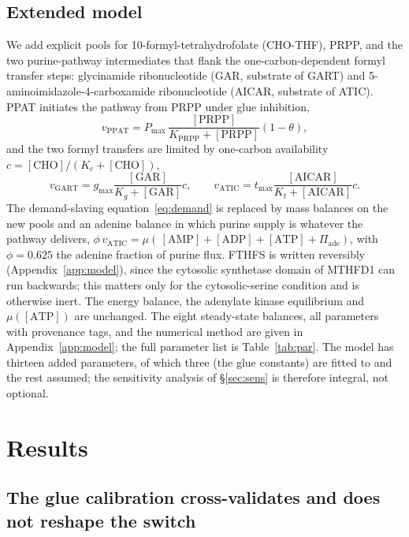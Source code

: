 \documentclass[a4paper,fleqn]{cas-sc}
\begin{document}
\subsection{Extended model}
\label{sec:extended}

We add explicit pools for 10-formyl-tetrahydrofolate (CHO-THF), PRPP, and the two
purine-pathway intermediates that flank the one-carbon-dependent formyl transfer
steps: glycinamide ribonucleotide (GAR, substrate of GART) and
5-aminoimidazole-4-carboxamide ribonucleotide (AICAR, substrate of ATIC). PPAT
initiates the pathway from PRPP under glue inhibition,
\begin{equation}
v_{\mathrm{PPAT}} = P_{\max}\,\frac{[\mathrm{PRPP}]}{K_{\mathrm{PRPP}}+[\mathrm{PRPP}]}
\left(1-\theta\right),
\end{equation}
and the two formyl transfers are limited by one-carbon availability
$c=[\mathrm{CHO}]/(K_c+[\mathrm{CHO}])$,
\begin{equation}
v_{\mathrm{GART}} = g_{\max}\frac{[\mathrm{GAR}]}{K_g+[\mathrm{GAR}]}c,\qquad
v_{\mathrm{ATIC}} = t_{\max}\frac{[\mathrm{AICAR}]}{K_t+[\mathrm{AICAR}]}c.
\end{equation}
The demand-slaving equation~\eqref{eq:demand} is replaced by mass balances on the
new pools and an adenine balance in which purine supply is whatever the pathway
delivers, $\phi\,v_{\mathrm{ATIC}}=\mu(\,[\mathrm{AMP}]+[\mathrm{ADP}]
+[\mathrm{ATP}]+\Pi_{\mathrm{ade}})$, with $\phi=0.625$ the adenine fraction of
purine flux. FTHFS is written reversibly (Appendix~\ref{app:model}), since the
cytosolic synthetase domain of MTHFD1 can run backwards; this matters only for
the cytosolic-serine condition and is otherwise inert. The energy balance, the
adenylate kinase equilibrium and $\mu([\mathrm{ATP}])$ are unchanged. The eight
steady-state balances, all parameters with provenance tags, and the numerical
method are given in Appendix~\ref{app:model}; the full parameter list is
Table~\ref{tab:par}. The model has thirteen added parameters, of which three (the
glue constants) are fitted to \citet{witus2026} and the rest assumed; the
sensitivity analysis of \S\ref{sec:sens} is therefore integral, not optional.

\section{Results}

\subsection{The glue calibration cross-validates and does not reshape the switch}
\end{document}
